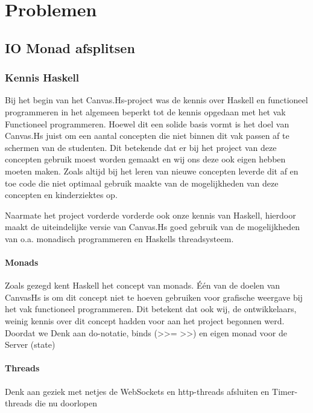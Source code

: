 \section{Problemen}
\subsection{IO Monad afsplitsen}


\subsubsection{Kennis Haskell}
Bij het begin van het Canvas.Hs-project was de kennis over Haskell en functioneel programmeren in het algemeen beperkt tot de kennis opgedaan met het vak Functioneel programmeren. Hoewel dit een solide basis vormt is het doel van Canvas.Hs juist om een aantal concepten die niet binnen dit vak passen af te schermen van de studenten. Dit betekende dat er bij het project van deze concepten gebruik moest worden gemaakt en wij ons deze ook eigen hebben moeten maken. Zoals altijd bij het leren van nieuwe concepten leverde dit af en toe code die niet optimaal gebruik maakte van de mogelijkheden van deze concepten en kinderziektes op. 

Naarmate het project vorderde vorderde ook onze kennis van Haskell, hierdoor maakt de uiteindelijke versie van Canvas.Hs goed gebruik van de mogelijkheden van o.a. monadisch programmeren en Haskells threadsysteem. 
\paragraph{Monads}
Zoals gezegd kent Haskell het concept van monads. Één van de doelen van CanvasHs is om dit concept niet te hoeven gebruiken voor grafische weergave bij het vak functioneel programmeren. Dit betekent dat ook wij, de ontwikkelaars, weinig kennis over dit concept hadden voor aan het project begonnen werd. Doordat we 
Denk aan do-notatie, binds (>>=
>>) en eigen monad voor de Server (state)
\paragraph{Threads}
Denk aan geziek met netjes de WebSockets en http-threads afsluiten en Timer-threads die nu doorlopen

